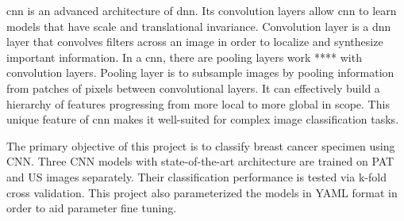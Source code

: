 \ac{cnn} is an advanced architecture of \ac{dnn}. Its convolution layers allow \ac{cnn} to learn models that have scale and translational invariance. Convolution layer is a \ac{dnn} layer that convolves filters across an image in order to localize and synthesize important information. In a \ac{cnn}, there are pooling layers work **** with convolution layers. Pooling layer is to subsample images by pooling information from patches of pixels between convolutional layers. It can effectively build a hierarchy of features progressing from more local to more global in scope. This unique feature of \ac{cnn} makes it well-suited for complex image classification tasks.

The primary objective of this project is to classify breast cancer specimen using CNN. Three CNN models with state-of-the-art architecture are trained on PAT and US images separately. Their classification performance is tested via k-fold cross validation. This project also parameterized the models in YAML format in order to aid parameter fine tuning.





